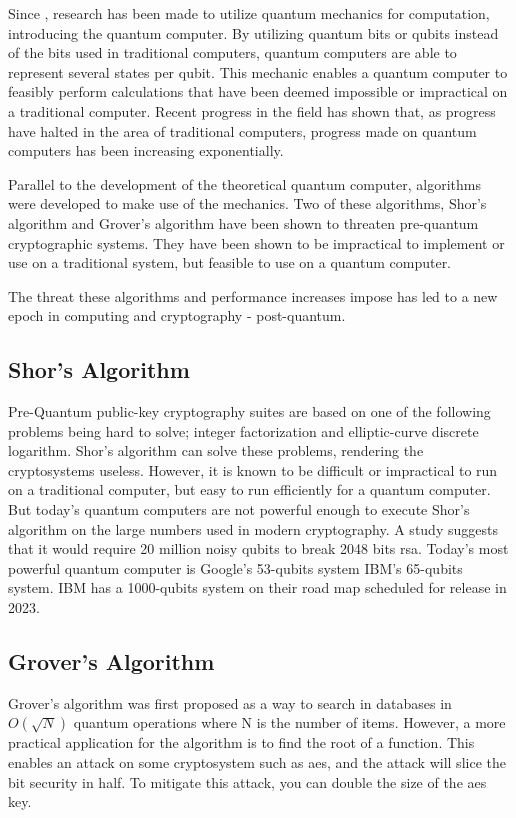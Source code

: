 Since , research has been made to utilize quantum mechanics for computation, introducing the quantum computer. By utilizing quantum bits or \glspl{qubit} instead of the bits used in traditional computers, quantum computers are able to represent several states per \gls{qubit}. This mechanic enables a quantum computer to feasibly perform calculations that have been deemed impossible or impractical on a traditional computer. Recent progress in the field has shown that, as progress have halted in the area of traditional computers, progress made on quantum computers has been increasing exponentially.

Parallel to the development of the theoretical quantum computer, algorithms were developed to make use of the mechanics. Two of these algorithms, Shor's algorithm and Grover's algorithm have been shown to threaten pre-quantum cryptographic systems. They have been shown to be impractical to implement or use on a traditional system, but feasible to use on a quantum computer.

The threat these algorithms and performance increases impose has led to a new epoch in computing and cryptography - post-quantum.
 

\subsection{Shor's Algorithm}

Pre-Quantum public-key cryptography suites are based on one of the following problems being hard to solve; integer factorization and elliptic-curve discrete logarithm. Shor's algorithm can solve these problems, rendering the cryptosystems useless\cite{shor1997}. However, it is known to be difficult or impractical to run on a traditional computer, but easy to run efficiently for a quantum computer. But today's quantum computers are not powerful enough to execute Shor's algorithm on the large numbers used in modern cryptography\cite{bernstein2017}. A study \cite{gidney2019} suggests that it would require 20 million noisy \glspl{qubit} to break 2048 bits \gls{rsa}. Today's most powerful quantum computer is Google's 53-\glspl{qubit} system\cite{google2019:quantum-computer} IBM's 65-\glspl{qubit} system\cite{ibm2020:quantum-computer}. IBM has a 1000-\glspl{qubit} system on their road map scheduled for release in 2023\cite{ibm2020:quantum-computer}.

\subsection{Grover's Algorithm}
Grover's algorithm was first proposed as a way to search in databases in $O(\sqrt N)$ quantum operations where N is the number of items\cite{grover1996}. However, a more practical application for the algorithm is to find the root of a function\cite{bernstein2017}. This enables an attack on some cryptosystem such as \gls{aes}, and the attack will slice the bit security in half. To mitigate this attack, you can double the size of the \gls{aes} key.

